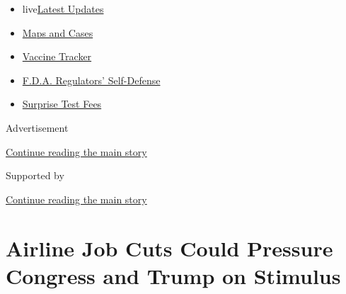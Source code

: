 \begin{itemize}
\tightlist
\item
  live\href{https://www.nytimes3xbfgragh.onion/2020/09/11/world/covid-19-coronavirus.html?name=styln-coronavirus-markets\&region=TOP_BANNER\&block=storyline_menu_recirc\&action=click\&pgtype=Article\&impression_id=beea3561-f4cb-11ea-8c3b-3fc590030245\&variant=undefined}{Latest
  Updates}
\item
  \href{https://www.nytimes3xbfgragh.onion/interactive/2020/us/coronavirus-us-cases.html?name=styln-coronavirus-markets\&region=TOP_BANNER\&block=storyline_menu_recirc\&action=click\&pgtype=Article\&impression_id=beea5c70-f4cb-11ea-8c3b-3fc590030245\&variant=undefined}{Maps
  and Cases}
\item
  \href{https://www.nytimes3xbfgragh.onion/interactive/2020/science/coronavirus-vaccine-tracker.html?name=styln-coronavirus-markets\&region=TOP_BANNER\&block=storyline_menu_recirc\&action=click\&pgtype=Article\&impression_id=beea5c71-f4cb-11ea-8c3b-3fc590030245\&variant=undefined}{Vaccine
  Tracker}
\item
  \href{https://www.nytimes3xbfgragh.onion/2020/09/10/us/politics/fda-coronavirus-vaccine.html?name=styln-coronavirus-markets\&region=TOP_BANNER\&block=storyline_menu_recirc\&action=click\&pgtype=Article\&impression_id=beea5c72-f4cb-11ea-8c3b-3fc590030245\&variant=undefined}{F.D.A.
  Regulators' Self-Defense}
\item
  \href{https://www.nytimes3xbfgragh.onion/2020/09/09/upshot/coronavirus-surprise-test-fees.html?name=styln-coronavirus-markets\&region=TOP_BANNER\&block=storyline_menu_recirc\&action=click\&pgtype=Article\&impression_id=beea5c73-f4cb-11ea-8c3b-3fc590030245\&variant=undefined}{Surprise
  Test Fees}
\end{itemize}

Advertisement

\protect\hyperlink{after-top}{Continue reading the main story}

Supported by

\protect\hyperlink{after-sponsor}{Continue reading the main story}

\hypertarget{airline-job-cuts-could-pressure-congress-and-trump-on-stimulus}{%
\section{Airline Job Cuts Could Pressure Congress and Trump on
Stimulus}\label{airline-job-cuts-could-pressure-congress-and-trump-on-stimulus}}

